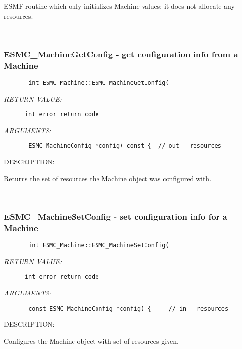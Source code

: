        ESMF routine which only initializes Machine values; it does not
        allocate any resources. 
   
 
\mbox{}\hrulefill\ 
 
\subsubsection{ESMC\_MachineGetConfig - get configuration info from a Machine}


  
\begin{verbatim}       int ESMC_Machine::ESMC_MachineGetConfig(\end{verbatim}{\em RETURN VALUE:}
\begin{verbatim}      int error return code\end{verbatim}{\em ARGUMENTS:}
\begin{verbatim}       ESMC_MachineConfig *config) const {  // out - resources\end{verbatim}
{\sf DESCRIPTION:\\ }


      Returns the set of resources the Machine object was configured with.
   
 
\mbox{}\hrulefill\ 
 
\subsubsection{ESMC\_MachineSetConfig - set configuration info for a Machine}


  
\begin{verbatim}       int ESMC_Machine::ESMC_MachineSetConfig(\end{verbatim}{\em RETURN VALUE:}
\begin{verbatim}      int error return code\end{verbatim}{\em ARGUMENTS:}
\begin{verbatim}       const ESMC_MachineConfig *config) {     // in - resources\end{verbatim}
{\sf DESCRIPTION:\\ }


      Configures the Machine object with set of resources given.
   
